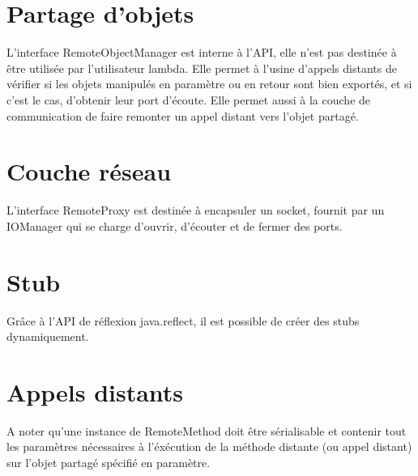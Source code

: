 \section{Partage d'objets}
L'interface RemoteObjectManager est interne à l'API, elle n'est pas destinée à être utilisée par l'utilisateur lambda. Elle permet à l'usine d'appels distants de vérifier si les objets manipulés en paramètre ou en retour sont bien exportés, et si c'est le cas, d'obtenir leur port d'écoute. Elle permet aussi à la couche de communication de faire remonter un appel distant vers l'objet partagé.

\section{Couche réseau}
L'interface RemoteProxy est destinée à encapsuler un socket, fournit par un IOManager qui se charge d'ouvrir, d'écouter et de fermer des ports.

\section{Stub}
\hspace{-.6cm}Grâce à l'API de réflexion java.reflect, il est possible de créer des stubs dynamiquement.

\section{Appels distants}
A noter qu'une instance de RemoteMethod doit être sérialisable et contenir tout les paramètres nécessaires à l'éxécution de la méthode distante (ou appel distant) sur l'objet partagé spécifié en paramètre.

